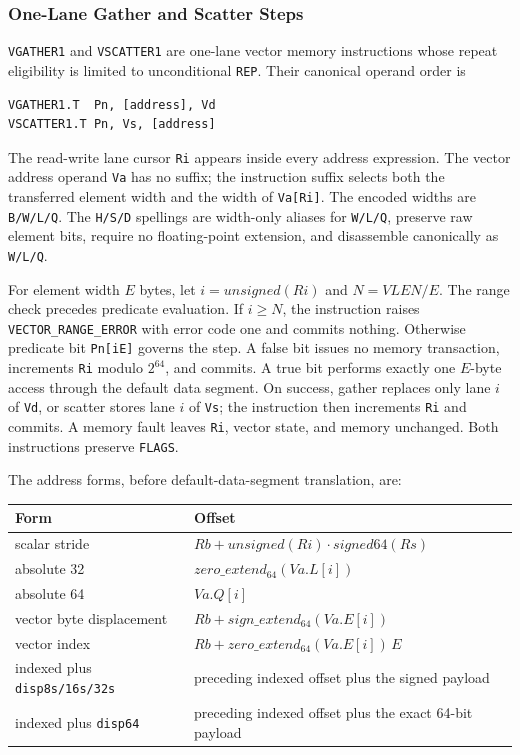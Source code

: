 \subsubsection{One-Lane Gather and Scatter Steps}

\texttt{VGATHER1} and \texttt{VSCATTER1} are one-lane vector memory
instructions whose repeat eligibility is limited to unconditional \texttt{REP}.
Their canonical operand order is

\begin{verbatim}
VGATHER1.T  Pn, [address], Vd
VSCATTER1.T Pn, Vs, [address]
\end{verbatim}

The read-write lane cursor \texttt{Ri} appears inside every address expression.
The vector address operand \texttt{Va} has no suffix; the instruction suffix
selects both the transferred element width and the width of \texttt{Va[Ri]}.
The encoded widths are \texttt{B/W/L/Q}.  The \texttt{H/S/D} spellings are
width-only aliases for \texttt{W/L/Q}, preserve raw element bits, require no
floating-point extension, and disassemble canonically as \texttt{W/L/Q}.

For element width $E$ bytes, let $i=unsigned(Ri)$ and $N=VLEN/E$.  The range
check precedes predicate evaluation.  If $i\mathrel{\ge}N$, the instruction
raises \texttt{VECTOR\_RANGE\_ERROR} with error code one and commits nothing.
Otherwise predicate bit \texttt{Pn[iE]} governs the step.  A false bit issues
no memory transaction, increments \texttt{Ri} modulo $2^{64}$, and commits.  A
true bit performs exactly one $E$-byte access through the default data segment.
On success, gather replaces only lane $i$ of \texttt{Vd}, or scatter stores
lane $i$ of \texttt{Vs}; the instruction then increments \texttt{Ri} and
commits.  A memory fault leaves \texttt{Ri}, vector state, and memory unchanged.
Both instructions preserve \texttt{FLAGS}.

The address forms, before default-data-segment translation, are:

\begin{center}
\begin{tabular}{ll}
\toprule
Form & Offset \\
\midrule
scalar stride & $Rb + unsigned(Ri)\mathbin{\cdot}signed64(Rs)$ \\
absolute 32 & $zero\_extend_{64}(Va.L[i])$ \\
absolute 64 & $Va.Q[i]$ \\
vector byte displacement & $Rb + sign\_extend_{64}(Va.E[i])$ \\
vector index & $Rb + zero\_extend_{64}(Va.E[i])\,E$ \\
indexed plus \texttt{disp8s/16s/32s} & preceding indexed offset plus the signed payload \\
indexed plus \texttt{disp64} & preceding indexed offset plus the exact 64-bit payload \\
\bottomrule
\end{tabular}
\end{center}

